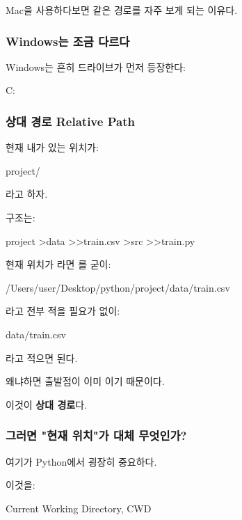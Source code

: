 Mac을 사용하다보면  같은 경로를 자주 보게 되는 이유다.

\subsubsection{Windows는 조금 다르다}

Windows는 흔히 드라이브가 먼저 등장한다:

\begin{dhkcode}
C:\Users\user\Desktop
\end{dhkcode}

\subsubsection{상대 경로 Relative Path}

현재 내가 있는 위치가:

\begin{dhkcode}
project/
\end{dhkcode}

라고 하자.

구조는:

\begin{dhkdir}
project
>data
>>train.csv
>src
>>train.py
\end{dhkdir}

현재 위치가 라면 를 굳이:

\begin{dhkcode}
/Users/user/Desktop/python/project/data/train.csv
\end{dhkcode}

라고 전부 적을 필요가 없이:

\begin{dhkcode}
data/train.csv
\end{dhkcode}

라고 적으면 된다.

왜냐하면 출발점이 이미 이기 때문이다.

이것이 \textbf{상대 경로}다.

\subsubsection{그러면 "현재 위치"가 대체 무엇인가?}

여기가 Python에서 굉장히 중요하다.

이것을:

\begin{dhknote}
\begin{dhksmry}[centered]
Current Working Directory, CWD
\end{dhksmry}
\end{dhknote}

